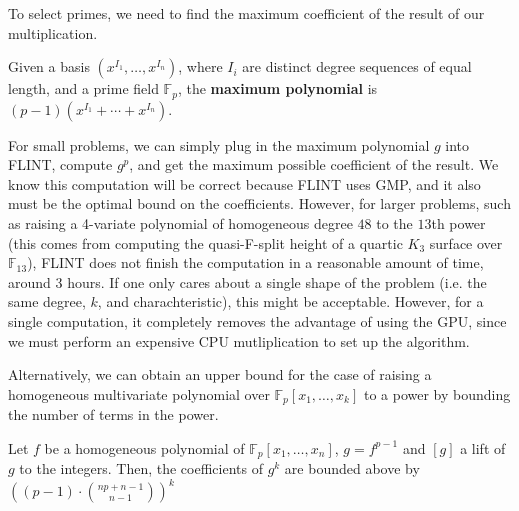 To select primes, we need to find the maximum coefficient of the result of our multiplication.

\begin{defn}
    Given a basis $(x^{I_1}, \dots, x^{I_n})$, where $I_i$ are distinct degree sequences of equal length, and a prime field $\mathbb{F}_p$, the \textbf{maximum polynomial} is $(p - 1)(x^{I_1} + \cdots + x^{I_n})$.
\end{defn}

For small problems, we can simply plug in the maximum polynomial $g$ into FLINT, compute $g ^ p$, and 
get the maximum possible coefficient of the result.
We know this computation will be correct because FLINT uses GMP,
and it also must be the optimal bound on the coefficients. 
However, for larger problems, such as raising a 4-variate polynomial of homogeneous degree $48$ to the $13$th power (this comes from computing the quasi-F-split height of a quartic $K_3$ surface over $\mathbb{F}_{13}$), FLINT does not finish the computation in a reasonable amount of time, around 3 hours.
If one only cares about a single shape of the problem (i.e. the same degree, \(k\), and charachteristic),
this might be acceptable.
However, for a single computation, it completely removes the advantage of using the GPU,
since we must perform an expensive CPU mutliplication to set up the algorithm.

Alternatively, we can obtain an upper bound for the case of raising a homogeneous multivariate polynomial over $\mathbb{F}_p[x_1, \dots , x_k]$ to a power
by bounding the number of terms in the power. 



\begin{thm}
    Let $f$ be a homogeneous polynomial of $\mathbb{F}_p[x_1, \dots, x_n]$, $g = f ^ {p - 1}$ and $[g]$ a lift of $g$ to the integers. Then, the coefficients of $g ^ k$ are bounded above by $((p - 1) \cdot \binom{np + n - 1}{n - 1}) ^ k$
\end{thm}

